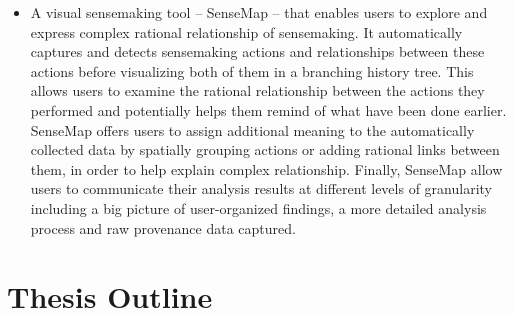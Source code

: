\begin{itemize}
	\item A visual sensemaking tool -- SenseMap -- that enables users to explore and express complex rational relationship of sensemaking. It automatically captures and detects sensemaking actions and relationships between these actions before visualizing both of them in a branching history tree. This allows users to examine the rational relationship between the actions they performed and potentially helps them remind of what have been done earlier. SenseMap offers users to assign additional meaning to the automatically collected data by spatially grouping actions or adding rational links between them, in order to help explain complex relationship. Finally, SenseMap allow users to communicate their analysis results at different levels of granularity including a big picture of user-organized findings, a more detailed analysis process and raw provenance data captured.
\end{itemize}


\section{Thesis Outline} 






